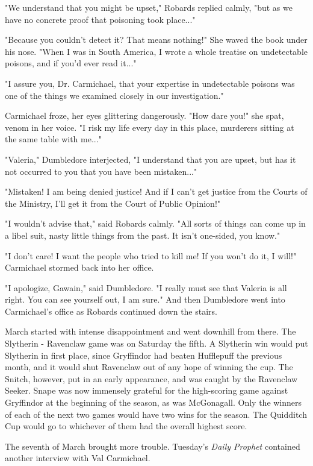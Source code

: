 \documentclass[a4paper,11pt]{article}
\begin{document}
"We understand that you might be upset," Robards replied calmly, "but as we have no concrete proof that poisoning took place..."

"Because you couldn't detect it? That means nothing!" She waved the book under his nose. "When I was in South America, I wrote a whole treatise on undetectable poisons, and if you'd ever read it..."

"I assure you, Dr. Carmichael, that your expertise in undetectable poisons was one of the things we examined closely in our investigation."

Carmichael froze, her eyes glittering dangerously. "How dare you!" she spat, venom in her voice. "I risk my life every day in this place, murderers sitting at the same table with me..."

"Valeria," Dumbledore interjected, "I understand that you are upset, but has it not occurred to you that you have been mistaken..."

"Mistaken! I am being denied justice! And if I can't get justice from the Courts of the Ministry, I'll get it from the Court of Public Opinion!"

"I wouldn't advise that," said Robards calmly. "All sorts of things can come up in a libel suit, nasty little things from the past. It isn't one-sided, you know."

"I don't care! I want the people who tried to kill me! If you won't do it, I will!" Carmichael stormed back into her office.

"I apologize, Gawain," said Dumbledore. "I really must see that Valeria is all right. You can see yourself out, I am sure." And then Dumbledore went into Carmichael's office as Robards continued down the stairs.

March started with intense disappointment and went downhill from there. The Slytherin - Ravenclaw game was on Saturday the fifth. A Slytherin win would put Slytherin in first place, since Gryffindor had beaten Hufflepuff the previous month, and it would shut Ravenclaw out of any hope of winning the cup. The Snitch, however, put in an early appearance, and was caught by the Ravenclaw Seeker. Snape was now immensely grateful for the high-scoring game against Gryffindor at the beginning of the season, as was McGonagall. Only the winners of each of the next two games would have two wins for the season. The Quidditch Cup would go to whichever of them had the overall highest score.

The seventh of March brought more trouble. Tuesday's \emph{Daily Prophet} contained another interview with Val Carmichael.
\end{document}
